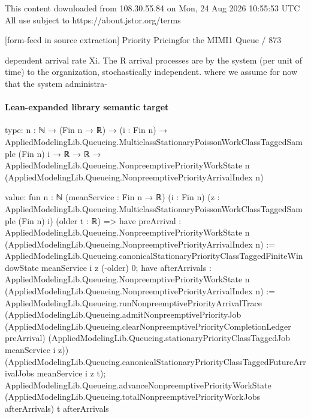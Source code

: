 \documentclass[10pt]{article}
\begin{document}
\begin{ReviewVerbatim}
                                                 This content downloaded from
                               108.30.55.84 on Mon, 24 Aug 2026 10:55:53 UTC
                                         All use subject to https://about.jstor.org/terms

[form-feed in source extraction]
                                                                                Priority Pricingfor the MIMI1 Queue / 873

dependent arrival rate Xi. The R arrival processes are                 by the system (per unit of time) to the organization,
stochastically independent.                                            where we assume for now that the system administra-
\end{ReviewVerbatim}



\paragraph{Lean-expanded library semantic target}
\begin{ReviewVerbatim}
type:
{n : ℕ} →
  (Fin n → ℝ) →
    (i : Fin n) →
      AppliedModelingLib.Queueing.MulticlassStationaryPoissonWorkClassTaggedSample (Fin n) i →
        ℝ →
          ℝ →
            AppliedModelingLib.Queueing.NonpreemptivePriorityWorkState n
              (AppliedModelingLib.Queueing.NonpreemptivePriorityArrivalIndex n)

value:
fun {n : ℕ} (meanService : Fin n → ℝ) (i : Fin n)
    (z : AppliedModelingLib.Queueing.MulticlassStationaryPoissonWorkClassTaggedSample (Fin n) i) (older t : ℝ) =>
  have preArrival :
    AppliedModelingLib.Queueing.NonpreemptivePriorityWorkState n
      (AppliedModelingLib.Queueing.NonpreemptivePriorityArrivalIndex n) :=
    AppliedModelingLib.Queueing.canonicalStationaryPriorityClassTaggedFiniteWindowState meanService i z (-older) 0;
  have afterArrivals :
    AppliedModelingLib.Queueing.NonpreemptivePriorityWorkState n
      (AppliedModelingLib.Queueing.NonpreemptivePriorityArrivalIndex n) :=
    AppliedModelingLib.Queueing.runNonpreemptivePriorityArrivalTrace
      (AppliedModelingLib.Queueing.admitNonpreemptivePriorityJob
        (AppliedModelingLib.Queueing.clearNonpreemptivePriorityCompletionLedger preArrival)
        (AppliedModelingLib.Queueing.stationaryPriorityClassTaggedJob meanService i z))
      (AppliedModelingLib.Queueing.canonicalStationaryPriorityClassTaggedFutureArrivalJobs meanService i z t);
  AppliedModelingLib.Queueing.advanceNonpreemptivePriorityWorkState
    (AppliedModelingLib.Queueing.totalNonpreemptivePriorityWorkJobs afterArrivals) t afterArrivals
\end{ReviewVerbatim}
\end{document}
